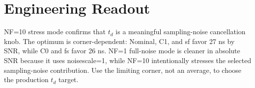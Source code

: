 \documentclass[11pt]{article}
\begin{document}
\section*{Engineering Readout}

NF=10 stress mode confirms that $t_d$ is a meaningful sampling-noise cancellation knob. The optimum is corner-dependent: Nominal, C1, and sf favor 27 ns by SNR, while C0 and fs favor 26 ns. NF=1 full-noise mode is cleaner in absolute SNR because it uses noisescale=1, while NF=10 intentionally stresses the selected sampling-noise contribution. Use the limiting corner, not an average, to choose the production $t_d$ target.
\end{document}

